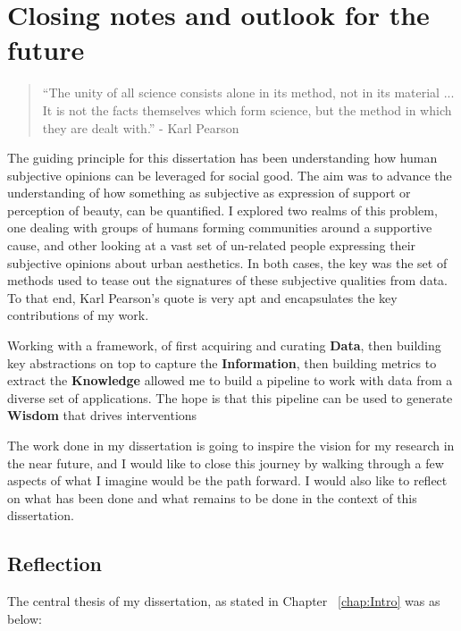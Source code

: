 \chapter{ Closing notes and outlook for the future }


\graphicspath{{Chapter6/plots/}}

\begin{quote}
    ``The unity of all science consists alone in its method, not in its material ... It is not the facts themselves which form science, but the method in which they are dealt with.'' - Karl Pearson
\end{quote}


The guiding principle for this dissertation has been understanding how human subjective opinions can be leveraged for social good. The aim was to advance the understanding of how something as subjective as expression of support or perception of beauty, can be quantified. 
I explored two realms of this problem, one dealing with groups of humans forming communities around a supportive cause, and other looking at a vast set of un-related people expressing their subjective opinions about urban aesthetics. In both cases, the key was the set of methods used to tease out the signatures of these subjective qualities from data. To that end, Karl Pearson's quote is very apt and encapsulates the key contributions of my work.

Working with a framework, of first acquiring and curating \textbf{Data}, then building key abstractions on top to capture the \textbf{Information}, then building metrics to extract the \textbf{Knowledge} allowed me to build a pipeline to work with data from a diverse set of applications. The hope is that this pipeline can be used to generate \textbf{Wisdom} that drives interventions

The work done in my dissertation is going to inspire the vision for my research in the near future, and I would like to close this journey by walking through a few aspects of what I imagine would be the path forward. I would also like to reflect on what has been done and what remains to be done in the context of this dissertation.

\section{Reflection}
The central thesis of my dissertation, as stated in Chapter ~\ref{chap:Intro} was as below: 

